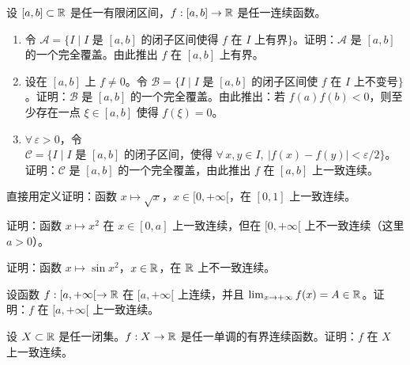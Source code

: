 \begin{exercise}
	\item 设 \([a,b]\subset\mathbb{R}\) 是任一有限闭区间，\(f:[a,b]\to\mathbb{R}\) 是任一连续函数。
	\begin{enumerate}[label=\arabic*)]
		\item 令 \(\mathscr{A}=\{I\mid I\text{ 是 }[a,b]\text{ 的闭子区间使得 }f\text{ 在 }I\text{ 上有界}\}\)。证明：\(\mathscr{A}\) 是 \([a,b]\) 的一个完全覆盖。由此推出 \(f\) 在 \([a,b]\) 上有界。
		\item 设在 \([a,b]\) 上 \(f\neq0\)。令 \(\mathscr{B}=\{I\mid I\text{ 是 }[a,b]\text{ 的闭子区间使 }f\text{ 在 }I\text{ 上不变号}\}\)。证明：\(\mathscr{B}\) 是 \([a,b]\) 的一个完全覆盖。由此推出：若 \(f(a)f(b)<0\)，则至少存在一点 \(\xi\in[a,b]\) 使得 \(f(\xi)=0\)。
		\item \(\forall\,\varepsilon>0\)，令 \(\mathscr{C}=\{I\mid I\text{ 是 }[a,b]\text{ 的闭子区间，使得 }\forall\,x,y\in I,\ |f(x)-f(y)|<\varepsilon/2\}\)。证明：\(\mathscr{C}\) 是 \([a,b]\) 的一个完全覆盖，由此推出 \(f\) 在 \([a,b]\) 上一致连续。
	\end{enumerate}
\end{exercise}

\begin{exercise}
	\item 直接用定义证明：函数 \(x\longmapsto\sqrt{x}\)，\(x\in[0,+\infty[\)，在 \([0,1]\) 上一致连续。
\end{exercise}

\begin{exercise}
	\item 证明：函数 \(x\longmapsto x^2\) 在 \(x\in[0,a]\) 上一致连续，但在 \([0,+\infty[\) 上不一致连续（这里 \(a>0\)）。
\end{exercise}

\begin{exercise}
	\item 证明：函数 \(x\longmapsto\sin x^2\)，\(x\in\mathbb{R}\)，在 \(\mathbb{R}\) 上不一致连续。
\end{exercise}

\begin{exercise}
	\item 设函数 \(f:[a,+\infty[\to\mathbb{R}\) 在 \([a,+\infty[\) 上连续，并且 \(\lim_{x\to+\infty}f(x)=A\in\mathbb{R}\)。证明：\(f\) 在 \([a,+\infty[\) 上一致连续。
\end{exercise}

\begin{exercise}
	\item 设 \(X\subset\mathbb{R}\) 是任一闭集。\(f:X\to\mathbb{R}\) 是任一单调的有界连续函数。证明：\(f\) 在 \(X\) 上一致连续。
\end{exercise}

